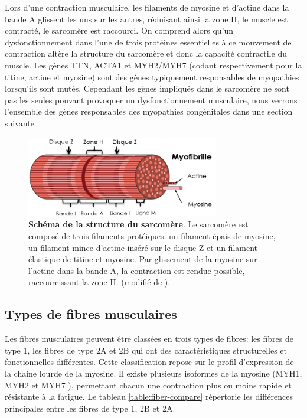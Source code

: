 Lors d'une contraction musculaire, les filaments de myosine et d'actine dans la bande A glissent les uns sur les autres, réduisant ainsi la zone H, le muscle est contracté, le sarcomère est raccourci. On comprend alors qu'un dysfonctionnement dans l'une de trois protéines essentielles à ce mouvement de contraction altère la structure du sarcomère et donc la capacité contractile du muscle. Les gènes TTN, ACTA1 et MYH2/MYH7 (codant respectivement pour la titine, actine et myosine) sont des gènes typiquement responsables de myopathies lorsqu'ils sont mutés. Cependant les gènes impliqués dans le sarcomère ne sont pas les seules pouvant provoquer un dysfonctionnement musculaire, nous verrons l'ensemble des gènes responsables des myopathies congénitales dans une section suivante.
\begin{figure}[!ht]
 \centering
 \includegraphics[width=0.75\textwidth]{figures/sarcomere.png}
 \caption[Schéma de la structure du sarcomère.]{\textbf{Schéma de la structure du sarcomère}. Le sarcomère est composé de trois filaments protéiques: un filament épais de myosine, un filament mince d'actine inséré sur le disque Z et un filament élastique de titine et myosine. Par glissement de la myosine sur l'actine dans la bande A, la contraction est rendue possible, raccourcissant la zone H. (modifié de \cite{burr_basic_2019}).}
 \label{fig:sarcomere}
\end{figure}

\subsection{Types de fibres musculaires}
Les fibres musculaires peuvent être classées en trois types de fibres: les fibres de type 1, les fibres de type 2A et 2B qui ont des caractéristiques structurelles et fonctionnelles différentes. Cette classification repose sur le profil d'expression de la chaine lourde de la myosine. Il existe plusieurs isoformes de la myosine (MYH1, MYH2 et MYH7 \cite{tajsharghi_myosinopathies_2013}), permettant chacun une contraction plus ou moins rapide et résistante à la fatigue. Le tableau \ref{table:fiber-compare} répertorie les différences principales entre les fibres de type 1, 2B et 2A.

